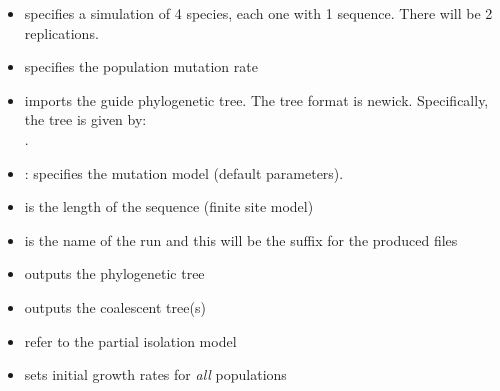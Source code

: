 \begin{itemize}
\item {} specifies a simulation of 4 species, each one with 1 sequence. There will be 2 replications.
\item {} specifies the population mutation rate
\item {} imports the guide phylogenetic tree. The tree format is newick. Specifically, the tree is given by:\\
. 
\item {}: specifies the mutation model (default parameters).
\item {} is the length of the sequence (finite site model)
\item {} is the name of the run and this will be the suffix for the produced files
\item {} outputs the phylogenetic tree
\item {} outputs the coalescent tree(s)
\item {} refer to the partial isolation model
\item {} sets initial growth rates for \emph{all} populations
\end{itemize}






